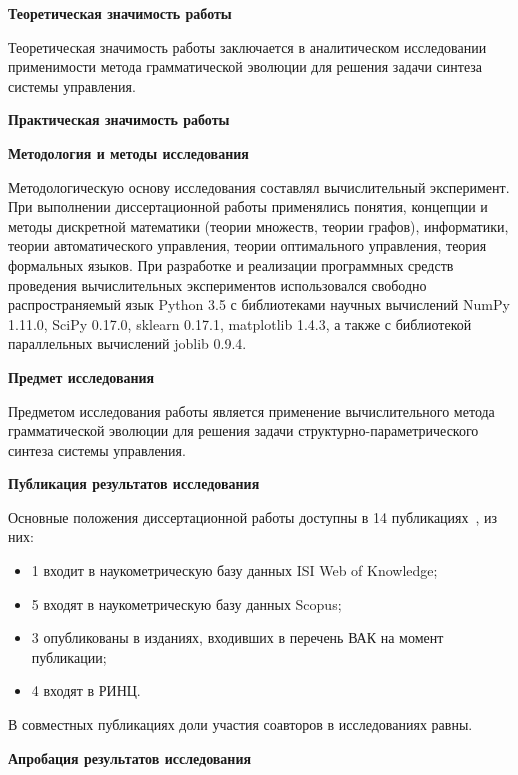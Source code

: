 \textbf{Теоретическая значимость работы}

Теоретическая значимость работы заключается в аналитическом исследовании применимости метода грамматической эволюции для решения задачи синтеза системы управления.

\textbf{Практическая значимость работы}


\textbf{Методология и методы исследования}

Методологическую основу исследования составлял вычислительный эксперимент.
При выполнении диссертационной работы применялись понятия, концепции и методы дискретной математики (теории множеств, теории графов), информатики, теории автоматического управления, теории оптимального управления, теория формальных языков. При разработке и реализации программных средств проведения вычислительных экспериментов использовался свободно распространяемый язык Python 3.5 с библиотеками научных вычислений NumPy 1.11.0, SciPy 0.17.0, sklearn 0.17.1, matplotlib 1.4.3, а также с библиотекой параллельных вычислений joblib 0.9.4. 

\textbf{Предмет исследования}

Предметом исследования работы является применение вычислительного метода грамматической эволюции для решения задачи структурно-параметрического синтеза системы управления.

\textbf{Публикация результатов исследования}

Основные положения диссертационной работы доступны в 14 публикациях~\cite{DanDiKaSo2015,DivKazSof2014,DivKazSof2013,DivKazSof2013a,ДанДиКаСо2014,ДивееКаза2013,ДивееКаза2012,Казарян2013,Казарян2014,Казарян2014a,КазКулЖар2010,КазХамКоч2014,КулЖарКаз2010}, из них:
\begin{itemize}
    \item 1 входит в наукометрическую базу данных ISI Web of Knowledge;
    \item 5 входят в наукометрическую базу данных Scopus;
    \item 3 опубликованы в изданиях, входивших в перечень ВАК на момент публикации;
    \item 4 входят в РИНЦ.
\end{itemize}

В совместных публикациях доли участия соавторов в исследованиях равны.

\textbf{Апробация результатов исследования}

